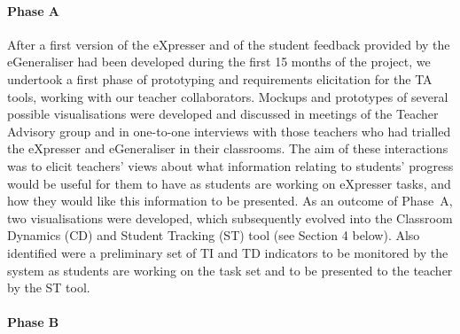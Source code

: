 \paragraph{Phase A}
\label{sec:phase-a}

After a first version of the eXpresser and of the student feedback
provided by the eGeneraliser had been developed during the first 15
months of the project, we undertook a first phase of prototyping and
requirements elicitation for the TA tools, working with our teacher
collaborators.    %
Mockups and
prototypes of several possible visualisations were developed and
discussed in meetings of the Teacher Advisory group and in one-to-one
interviews with those teachers who had trialled the eXpresser and
eGeneraliser in their classrooms. The aim of these interactions was to
elicit teachers' views about what information relating to students'
progress would be useful for them to have as
students are working on eXpresser tasks, and how they would like this
information to be presented.  
As an outcome of Phase~A, two visualisations were developed, 
which subsequently evolved into the Classroom Dynamics
(CD) and Student Tracking (ST) tool (see Section 4 below). 
Also identified were a preliminary set of TI and TD indicators
to be monitored by the system as students are working on the task
set and to be presented to the teacher by the ST tool.

\paragraph{Phase B}
\label{sec:phase-b}

